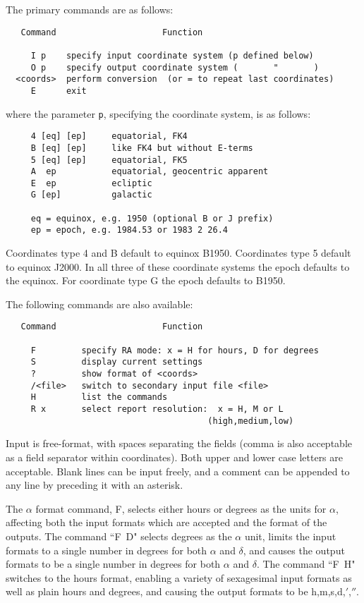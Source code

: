 \goodbreak
The primary commands are as follows:
\begin{verbatim}
   Command                     Function

     I p    specify input coordinate system (p defined below)
     O p    specify output coordinate system (       "       )
  <coords>  perform conversion  (or = to repeat last coordinates)
     E      exit
\end{verbatim}
where the parameter {\tt p}, specifying the coordinate system, is
as follows:
\begin{verbatim}
     4 [eq] [ep]     equatorial, FK4
     B [eq] [ep]     like FK4 but without E-terms
     5 [eq] [ep]     equatorial, FK5
     A  ep           equatorial, geocentric apparent
     E  ep           ecliptic
     G [ep]          galactic

     eq = equinox, e.g. 1950 (optional B or J prefix)
     ep = epoch, e.g. 1984.53 or 1983 2 26.4
\end{verbatim}
Coordinates type 4 and B default to equinox B1950. Coordinates type 5 default 
to equinox J2000. In all three of these coordinate systems the epoch defaults 
to the equinox. For coordinate type G the epoch defaults to B1950.

The following commands are also available:
\begin{verbatim}
   Command                     Function

     F         specify RA mode: x = H for hours, D for degrees
     S         display current settings
     ?         show format of <coords>
     /<file>   switch to secondary input file <file>
     H         list the commands
     R x       select report resolution:  x = H, M or L
                                        (high,medium,low)
\end{verbatim}

Input is free-format, with spaces separating the fields (comma is
also acceptable as a field separator within coordinates).
Both upper and lower case letters are acceptable.
Blank lines can be input freely, and a comment can be appended to
any line by preceding it with an asterisk.

The $\alpha$ format command, F, selects either hours or degrees as
the units for $\alpha$, affecting both the input formats which are
accepted and the format of the outputs.  The command ``F~D"
selects degrees as the $\alpha$ unit, limits the input formats
to a single number in degrees for both $\alpha$ and $\delta$, and
causes the output formats to be a single number in degrees
for both $\alpha$ and $\delta$.  The command ``F~H" switches to the
hours format, enabling a variety of sexagesimal input
formats as well as plain hours and degrees, and causing
the output formats to be h,m,s,d,$'$,$''$.

